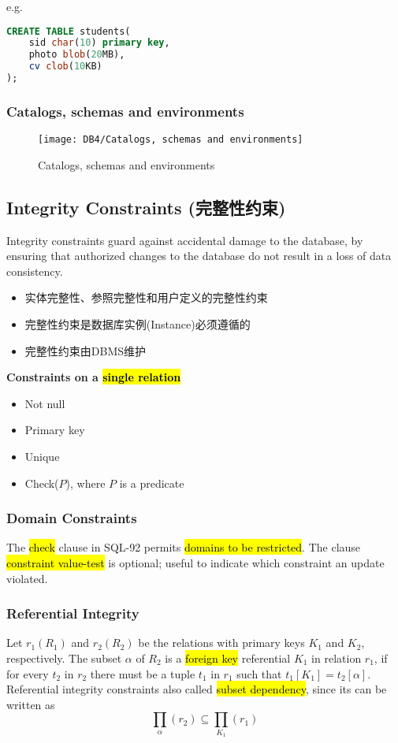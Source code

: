 e.g. 
\begin{lstlisting}[language={sql}]
CREATE TABLE students(
    sid char(10) primary key,
    photo blob(20MB),
    cv clob(10KB)
);
\end{lstlisting}


\subsubsection{Catalogs, schemas and environments}

\begin{figure}[H]
    \centering
    \texttt{[image: DB4/Catalogs, schemas and environments]}
    \caption{Catalogs, schemas and environments}
\end{figure}

\subsection{Integrity Constraints (完整性约束)}
Integrity constraints guard against accidental damage to the database, by ensuring that authorized changes to the database do not result in a loss of data consistency. 
\begin{itemize}
    \item 实体完整性、参照完整性和用户定义的完整性约束
    \item 完整性约束是数据库实例(Instance)必须遵循的
    \item 完整性约束由DBMS维护    
\end{itemize}

\textbf{Constraints on a \hl{single relation}}
\begin{itemize}
    \item Not null
    \item Primary key
    \item Unique
    \item Check($P$), where $P$ is a predicate
\end{itemize}

\subsubsection{Domain Constraints}
The \hl{check} clause in SQL-92 permits \hl{domains to be restricted}. The clause \hl{constraint value-test} is optional; useful to indicate which constraint an update violated.


\subsubsection{Referential Integrity}
\begin{definition}
    Let $r_1(R_1)$ and $r_2(R_2)$ be the relations with primary keys $K_1$ and $K_2$, respectively. The subset $\alpha$ of $R_2$ is a \hl{foreign key} referential $K_1$ in relation $r_1$, if for every $t_2$ in $r_2$ there must be a tuple $t_1$ in $r_1$ such that $t_1[K_1]=t_2[\alpha]$. Referential integrity constraints also called \hl{subset dependency}, since its can be written as 
    \[ \prod_{\alpha}(r_2) \subseteq \prod_{K_1}(r_1) \]
\end{definition}

